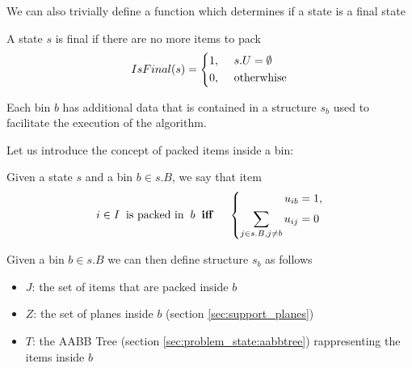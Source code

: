 We can also trivially define a function which determines if a state is a final state
\begin{definition}
    A state $s$ is final if there are no more items to pack
    \begin{equation}
        \label{algo:state_final}%
        IsFinal(s) = \left\{\begin{aligned}
            1,\hspace{0.5cm}& s.U = \emptyset \\
            0,\hspace{0.5cm}& \text{otherwhise}
        \end{aligned}
        \right.
    \end{equation}
\end{definition}

Each bin $b$ has additional data that is contained in a structure $s_b$ used to facilitate the execution of the algorithm. 

Let us introduce the concept of packed items inside a bin:
\begin{definition}
    Given a state $s$ and a bin $b \in s.B$, we say that item
    \begin{equation*}
        \begin{aligned}
            i \in I \hspace{.2cm}\text{is packed in} \hspace{.2cm}b \hspace{.2cm}& \textbf{iff} \hspace{.2cm}& \left\{ 
                \begin{aligned}
                    u_{ib} & = 1, \\
                    \sum_{j \in s.B, j \neq b}{u_{ij}} & = 0
                \end{aligned}
            \right.
        \end{aligned}
    \end{equation*}
\end{definition}

Given a bin $b \in s.B$ we can then define structure $s_b$ as follows
\begin{itemize}
    \item $J$: the set of items that are packed inside $b$
    \item $Z$: the set of planes inside $b$ (section \ref{sec:support_planes})
    \item $T$: the AABB Tree (section \ref{sec:problem_state:aabbtree}) rappresenting the items inside $b$
\end{itemize}

